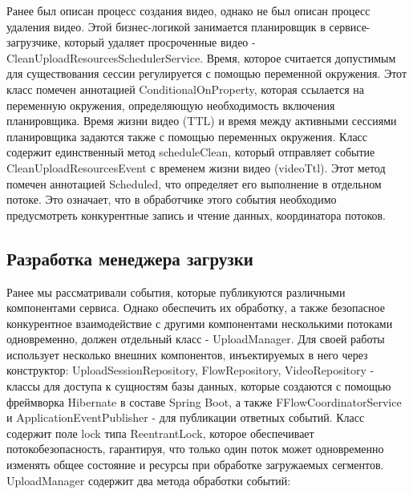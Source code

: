 	Ранее был описан процесс создания видео, однако не был описан процесс удаления видео. Этой бизнес-логикой занимается планировщик в сервисе-загрузчике, который удаляет просроченные видео - CleanUploadResourcesSchedulerService. Время, которое считается допустимым для существования сессии регулируется с помощью переменной окружения. Этот класс помечен аннотацией ConditionalOnProperty, которая ссылается на переменную окружения, определяющую необходимость включения планировщика. Время жизни видео (TTL) и время между активными сессиями планировщика задаются также с помощью переменных окружения. Класс содержит единственный метод scheduleClean, который отправляет событие CleanUploadResourcesEvent с временем жизни видео (videoTtl). Этот метод помечен аннотацией Scheduled, что определяет его выполнение в отдельном потоке. Это означает, что в обработчике этого события необходимо предусмотреть конкурентные запись и чтение данных, координатора потоков.
	
	\subsection{Разработка менеджера загрузки}
	
	Ранее мы рассматривали события, которые публикуются различными компонентами сервиса. Однако обеспечить их обработку, а также безопасное конкурентное взаимодействие с другими компонентами несколькими потоками одновременно, должен отдельный класс - UploadManager. Для своей работы использует несколько внешних компонентов, инъектируемых в него через конструктор: UploadSessionRepository, FlowRepository, VideoRepository - классы для доступа к сущностям базы данных, которые создаются с помощью фреймворка Hibernate в составе Spring Boot, а также FFlowCoordinatorService и ApplicationEventPublisher - для публикации ответных событий. Класс содержит поле lock типа ReentrantLock, которое обеспечивает потокобезопасность, гарантируя, что только один поток может одновременно изменять общее состояние и ресурсы при обработке загружаемых сегментов. UploadManager содержит два метода обработки событий:
	
